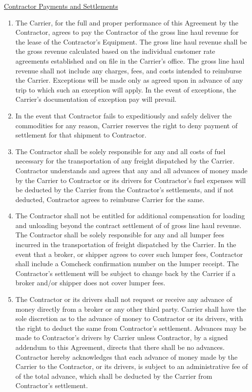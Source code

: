 \underline{Contractor Payments and Settlements}
\begin{enumerate}
    \item The Carrier, for the full and proper performance of this
    Agreement by the Contractor, agrees to pay the Contractor {\bfseries
    \GrossRevenueCommision} of the gross line haul revenue for the lease of
    the Contractor's Equipment. The gross line haul revenue shall be the
    gross revenue calculated based on the individual customer rate
    agreements established and on file in the Carrier's office. The gross
    line haul revenue shall not include any charges, fees, and costs
    intended to reimburse the Carrier. Exceptions will be made only as
    agreed upon in advance of any trip to which such an exception will
    apply. In the event of exceptions, the Carrier's documentation of
    exception pay will prevail.

    \item In the event that Contractor fails to expeditiously and safely
    deliver the commodities for any reason, Carrier reserves the right to
    deny payment of settlement for that shipment to Contractor.

    \item The Contractor shall be solely responsible for any and all costs
    of fuel necessary for the transportation of any freight dispatched by
    the Carrier. Contractor understands and agrees that any and all
    advances of money made by the Carrier to Contractor or its drivers for
    Contractor's fuel expenses will be deducted by the Carrier from the
    Contractor's settlements, and if not deducted, Contractor agrees to
    reimburse Carrier for the same.

    \item The Contractor shall not be entitled for additional compensation
    for loading and unloading beyond the contract settlement of {\bfseries
    \GrossRevenueCommision} of gross line haul revenue. The Contractor
    shall be solely responsible for any and all lumper fees incurred in the
    transportation of freight dispatched by the Carrier. In the event that
    a broker, or shipper agrees to cover such lumper fees, Contractor shall
    include a Comcheck confirmation number on the lumper receipt. The
    Contractor's settlement will be subject to change back by the Carrier
    if a broker and/or shipper does not cover lumper fees.

    \item The Contractor or its drivers shall not request or receive any
    advance of money directly from a broker or any other third party.
    Carrier shall have the sole discretion as to the advance of money to
    Contractor or its drivers, with the right to deduct the same from
    Contractor's settlement. Advances may be made to Contractor's drivers
    by Carrier unless Contractor, by a signed addendum to this Agreement,
    directs that there shall be no advances. Contractor hereby acknowledges
    that each advance of money made by the Carrier to the Contractor, or
    its drivers, is subject to an administrative fee of {\bfseries
    \CashAdvanceServiceFee} of the total advance, which shall be deducted
    by the Carrier from Contractor's settlement.


\end{enumerate}
